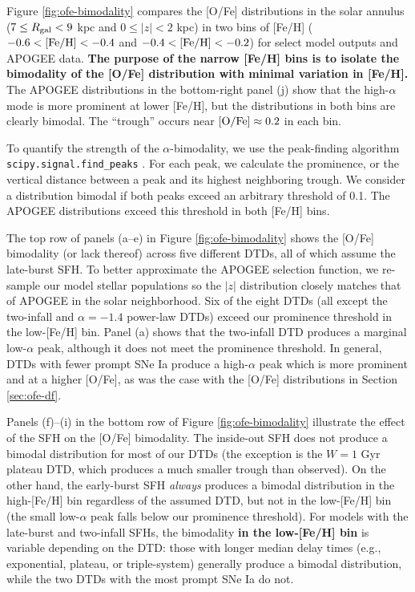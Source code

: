 \documentclass[twocolumn,twocolappendix,linenumbers]{aastex631}
\begin{document}
Figure \ref{fig:ofe-bimodality} compares the [O/Fe] distributions in the solar annulus ($7\leq R_{\rm gal}<9$ kpc and $0\leq|z|<2$ kpc) in two bins of [Fe/H] ($-0.6<{\rm [Fe/H]}<-0.4$ and $-0.4<{\rm [Fe/H]}<-0.2$) for select model outputs and APOGEE data. {\bf The purpose of the narrow [Fe/H] bins is to isolate the bimodality of the [O/Fe] distribution with minimal variation in [Fe/H].} The APOGEE distributions in the bottom-right panel (j) show that the high-$\alpha$ mode is more prominent at lower [Fe/H], but the distributions in both bins are clearly bimodal. The ``trough'' occurs near ${\rm [O/Fe]}\approx0.2$ in each bin.

To quantify the strength of the $\alpha$-bimodality, we use the peak-finding algorithm {\tt scipy.signal.find\_peaks} \citep{2020SciPy-NMeth}. For each peak, we calculate the prominence, or the vertical distance between a peak and its highest neighboring trough. We consider a distribution bimodal if both peaks exceed an arbitrary threshold of 0.1. The APOGEE distributions exceed this threshold in both [Fe/H] bins.

The top row of panels (a--e) in Figure \ref{fig:ofe-bimodality} shows the [O/Fe] bimodality (or lack thereof) across five different DTDs, all of which assume the late-burst SFH. To better approximate the APOGEE selection function, we re-sample our model stellar populations so the $|z|$ distribution closely matches that of APOGEE in the solar neighborhood. Six of the eight DTDs (all except the two-infall and $\alpha=-1.4$ power-law DTDs) exceed our prominence threshold in the low-[Fe/H] bin. Panel (a) shows that the two-infall DTD produces a marginal low-$\alpha$ peak, although it does not meet the prominence threshold. In general, DTDs with fewer prompt SNe Ia produce a high-$\alpha$ peak which is more prominent and at a higher [O/Fe], as was the case with the [O/Fe] distributions in Section \ref{sec:ofe-df}. 

Panels (f)--(i) in the bottom row of Figure \ref{fig:ofe-bimodality} illustrate the effect of the SFH on the [O/Fe] bimodality. The inside-out SFH does not produce a bimodal distribution for most of our DTDs (the exception is the $W=1$ Gyr plateau DTD, which produces a much smaller trough than observed). On the other hand, the early-burst SFH {\it always} produces a bimodal distribution in the high-[Fe/H] bin regardless of the assumed DTD, but not in the low-[Fe/H] bin (the small low-$\alpha$ peak falls below our prominence threshold). For models with the late-burst and two-infall SFHs, the bimodality {\bf in the low-[Fe/H] bin} is variable depending on the DTD: those with longer median delay times (e.g., exponential, plateau, or triple-system) generally produce a bimodal distribution, while the two DTDs with the most prompt SNe Ia do not. 
\end{document}
